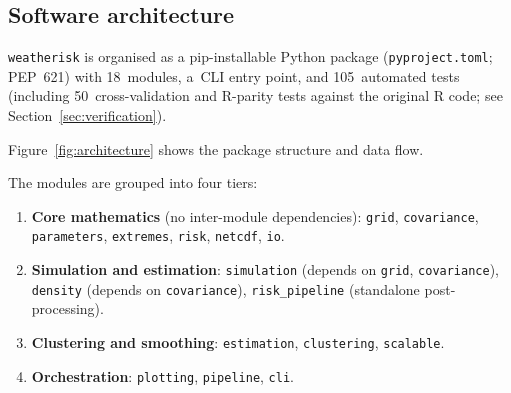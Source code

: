 \documentclass[a4paper]{elsarticle}
\begin{document}
\subsection{Software architecture}
\label{sec:architecture}

\begin{sloppypar}
\texttt{weatherisk} is organised as a pip-installable
Python package (\texttt{pyproject.toml}; PEP~621)
with 18~modules, a~CLI entry point, and 105~automated tests
(including 50~cross-validation and R-parity tests against the
original R code; see Section~\ref{sec:verification}).
\end{sloppypar}
Figure~\ref{fig:architecture} shows the package structure and data flow.

The modules are grouped into four tiers:
\begin{enumerate}
\item \textbf{Core mathematics}
  (no inter-module dependencies):
  \texttt{grid}, \texttt{covariance},
  \texttt{para\-meters}, \texttt{extremes},
  \texttt{risk}, \texttt{netcdf}, \texttt{io}.
\item \textbf{Simulation and estimation}:
  \texttt{simu\-lation}
  (depends on \texttt{grid},
  \texttt{covar\-iance}),
  \texttt{density}
  (depends on \texttt{covar\-iance}),
  \texttt{risk\_pipe\-line}
  (standalone post-processing).
\item \textbf{Clustering and smoothing}:
  \texttt{estimation}, \texttt{clustering}, \texttt{scalable}.
\item \textbf{Orchestration}:
  \texttt{plotting}, \texttt{pipeline}, \texttt{cli}.
\end{enumerate}
\end{document}
